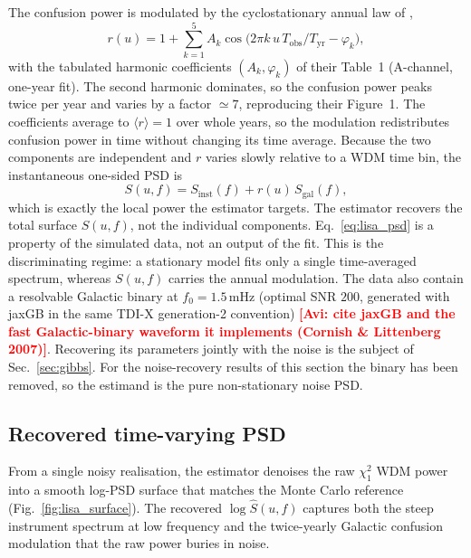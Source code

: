 \documentclass[
  aps,
  prd,
  twocolumn,
  amsmath,
  amssymb,
  nofootinbib,
  superscriptaddress,
  longbibliography,
]{revtex4-2}
\newcommand{\project}[1]{\textsf{#1}}
\newcommand{\avi}[1]{\textcolor{red}{\textbf{[Avi: #1]}}}
\begin{document}
The confusion power is modulated by the cyclostationary annual law of
\citet{digman2022cyclostationary},
\begin{equation}
r(u) = 1 + \sum_{k=1}^{5} A_k \cos\!\big(2\pi k\,u\, T_{\mathrm{obs}}/T_{\mathrm{yr}} - \varphi_k\big),
\label{eq:dc_modulation}
\end{equation}
with the tabulated harmonic coefficients $(A_k,\varphi_k)$ of their Table~1
(A-channel, one-year fit). The second harmonic dominates, so the confusion power
peaks twice per year and varies by a factor $\simeq 7$, reproducing their
Figure~1. The coefficients average to $\langle r\rangle = 1$ over whole years, so
the modulation redistributes confusion power in time without changing its time
average. Because
the two components are independent and $r$ varies slowly relative to a WDM time
bin, the instantaneous one-sided PSD is
\begin{equation}
S(u,f) = S_{\mathrm{inst}}(f) + r(u)\,S_{\mathrm{gal}}(f),
\label{eq:lisa_psd}
\end{equation}
which is exactly the local power the estimator targets. The estimator recovers
the total surface $S(u,f)$, not the individual components. Eq.~\eqref{eq:lisa_psd}
is a property of the simulated data, not an output of the fit. This is the
discriminating regime: a stationary model fits only a single time-averaged
spectrum, whereas $S(u,f)$ carries the annual modulation. The data also contain a resolvable
Galactic binary at $f_0 = 1.5\,\mathrm{mHz}$ (optimal SNR $200$, generated with
\project{jaxGB} in the same TDI-X generation-2 convention)
\avi{cite \project{jaxGB} and the fast Galactic-binary waveform it implements
(Cornish \& Littenberg 2007)}. Recovering its
parameters jointly with the noise is the subject of Sec.~\ref{sec:gibbs}. For the
noise-recovery results of this section the binary has been removed, so the
estimand is the pure non-stationary noise PSD.

\subsection{Recovered time-varying PSD}
\label{sec:lisa_recovery}

From a single noisy realisation, the estimator denoises the raw $\chi^2_1$ WDM
power into a smooth log-PSD surface that matches the Monte Carlo reference
(Fig.~\ref{fig:lisa_surface}). The recovered $\log\hat S(u,f)$ captures both the
steep instrument spectrum at low frequency and the twice-yearly Galactic
confusion modulation that the raw power buries in noise.
\end{document}
